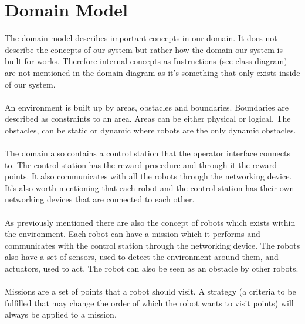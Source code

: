\section{Domain Model}
The domain model describes important concepts in our domain. 
It does not describe the concepts of our system but rather how the domain our system is built for works. 
Therefore internal concepts as Instructions (see class diagram) are not mentioned in the domain diagram as it's something that only exists inside of our system.
\\ \\
An environment is built up by areas, obstacles and boundaries.
Boundaries are described as constraints to an area. Areas can be either physical or logical.
The obstacles, can be static or dynamic where robots are the only dynamic obstacles. 
\\ \\
The domain also contains a control station that the operator interface connects to.
The control station has the reward procedure and through it the reward points.
It also communicates with all the robots through the networking device. It's also worth mentioning that each robot and the control station has their own networking devices that are connected to each other.
\\ \\
As previously mentioned there are also the concept of robots which exists within the environment.
Each robot can have a mission which it performs and communicates with the control station through the networking device. 
The robots also have a set of sensors, used to detect the environment around them, and actuators, used to act. The robot can also be seen as an obstacle by other robots.
\\ \\
Missions are a set of points that a robot should visit. A strategy (a criteria to be fulfilled that may change the order of which the robot wants to visit points) will always be applied to a mission.
